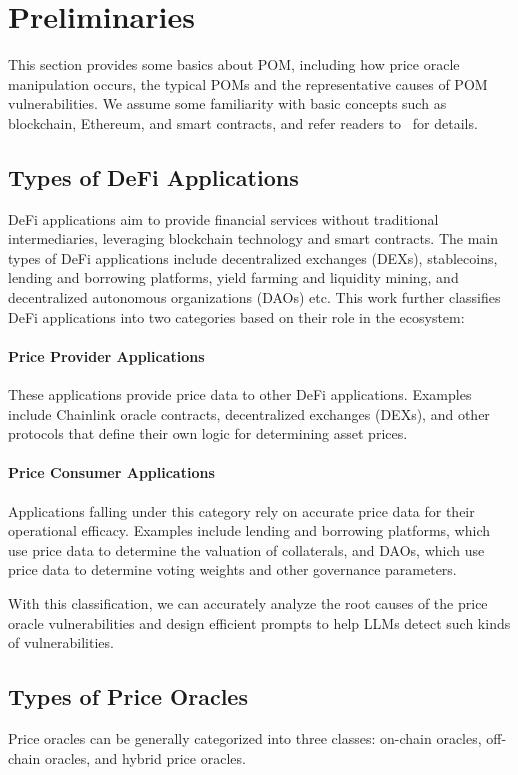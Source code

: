 \section{Preliminaries} \label{sec:background}
This section provides some basics about POM, including how price oracle manipulation occurs, the typical POMs and the representative causes of POM vulnerabilities.
We assume some familiarity with basic concepts such as blockchain, Ethereum, and smart contracts, and refer readers to~\cite{wood2014ethereum} for details. 

\subsection{Types of DeFi Applications}
DeFi applications aim to provide financial services without traditional intermediaries, leveraging blockchain technology and smart contracts.
The main types of DeFi applications include decentralized exchanges (DEXs), stablecoins, lending and borrowing platforms, yield farming and liquidity mining, and decentralized autonomous organizations (DAOs) etc.
This work further classifies DeFi applications into two categories based on their role in the ecosystem:
\paragraph{Price Provider Applications} These applications provide price data to other DeFi applications. Examples include Chainlink oracle contracts, decentralized exchanges (DEXs), and other protocols that define their own logic for determining asset prices.
\paragraph{Price Consumer Applications} Applications falling under this category rely on accurate price data for their operational efficacy. Examples include lending and borrowing platforms, which use price data to determine the valuation of collaterals, and DAOs, which use price data to determine voting weights and other governance parameters.

With this classification, we can accurately analyze the root causes of the price oracle vulnerabilities and design efficient prompts to help LLMs detect such kinds of vulnerabilities.

\subsection{Types of Price Oracles}
Price oracles can be generally categorized into three classes: on-chain oracles, off-chain oracles, and hybrid price oracles. 
